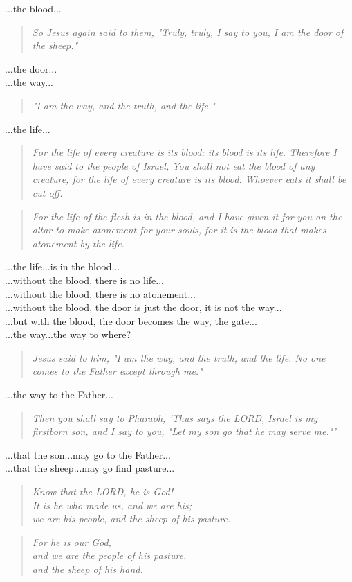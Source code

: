 \documentclass[10pt,oneside,footinclude=true,headinclude=true]{scrbook} %
\newcommand\quot[1]{
	\begin{quote}\textit{\small#1}\end{quote}
}
\begin{document}
\noindent...the blood...

\quot{So Jesus again said to them, "Truly, truly, I say to you, I am the door of the sheep."}

\noindent...the door...\\
...the way...

\quot{"I am the way, and the truth, and the life."}

\noindent...the life...

\quot{For the life of every creature is its blood: its blood is its life. Therefore I have said to the people of Israel, You shall not eat the blood of any creature, for the life of every creature is its blood. Whoever eats it shall be cut off.}

\quot{For the life of the flesh is in the blood, and I have given it for you on the altar to make atonement for your souls, for it is the blood that makes atonement by the life.}

\noindent...the life...is in the blood...\\
...without the blood, there is no life...\\
...without the blood, there is no atonement...\\
...without the blood, the door is just the door, it is not the way...\\
...but with the blood, the door becomes the way, the gate...\\

\noindent...the way...the way to where?

\quot{Jesus said to him, "I am the way, and the truth, and the life. No one comes to the Father except through me."}

\noindent...the way to the Father...

\quot{Then you shall say to Pharaoh, 'Thus says the LORD, Israel is my firstborn son,  and I say to you, "Let my son go that he may serve me."'}

\noindent...that the son...may go to the Father...\\
...that the sheep...may go find pasture...

\quot{Know that the LORD, he is God!\\
\hspace*{5mm}It is he who made us, and we are his;\\
\hspace*{5mm}we are his people, and the sheep of his pasture.}

\quot{For he is our God,\\
\hspace*{5mm}and we are the people of his pasture,\\
\hspace*{5mm}and the sheep of his hand.}
\end{document}
